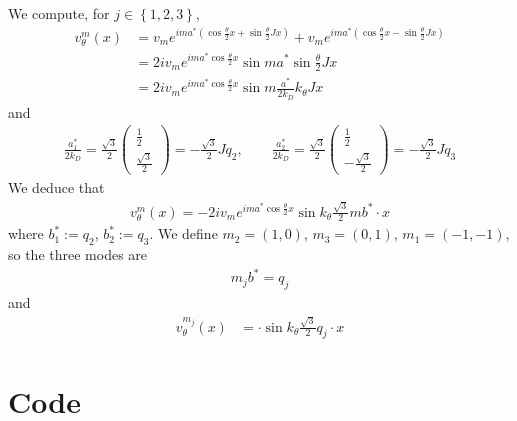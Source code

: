 \documentclass[11pt,a4paper,reqno,french,tikz]{amsart}
\newcommand{\pa}[1]{\left( #1 \right)} %
\newcommand{\acs}[1]{\left\{ #1 \right\}} %
\newcommand{\f}[2]{\frac{#1}{#2}} %
\newcommand{\mat}[1]{\begin{pmatrix} #1 \end{pmatrix}} %
\begin{document}
We compute, for $j \in \acs{1,2,3}$,
\begin{align*}
	v^m_\theta(x) &= v_m e^{ima^* \pa{\cos \f{\theta}{2} x + \sin \f{\theta}{2} J x}} +   v_m e^{ima^* \pa{\cos \f{\theta}{2} x - \sin \f{\theta}{2} J x}} \\
		    &= 2i v_m e^{ima^* \cos \f{\theta}{2} x}  \sin ma^* \sin \f{\theta}{2}  Jx \\
		    &=  2i v_m e^{ima^* \cos \f{\theta}{2} x}  \sin m\f{a^*}{2 k_D} k_\theta J x
\end{align*}
and
\begin{align*}
\f{a^*_1}{2 k_D} = \f{\sqrt 3}{2} \mat{ \f{1}{2} \\ \f{\sqrt 3}{2}} = - \f{\sqrt 3}{2} Jq_2, \qquad \f{a^*_2}{2 k_D} = \f{\sqrt 3}{2} \mat{ \f{1}{2} \\ -\f{\sqrt 3}{2}}= - \f{\sqrt 3}{2} Jq_3
\end{align*}
We deduce that
\begin{align*}
	v^m_\theta(x) =  -2i v_m e^{ima^* \cos \f{\theta}{2} x}  \sin k_\theta \f{\sqrt 3}{2} mb^* \cdot x
\end{align*}
where $b^*_1 := q_2$, $b^*_2 := q_3$. We define $m_2=(1,0)$, $m_3=(0,1)$, $m_1 = (-1,-1)$, so the three modes are
\begin{align*}
m_j b^* = q_j
\end{align*}
and
\begin{align*}
	v^{m_j}_\theta(x) &=  \cdot \sin k_\theta \f{\sqrt 3}{2} q_j \cdot x 
\end{align*}



\section{Code}%
\label{sec:code}
\end{document}
